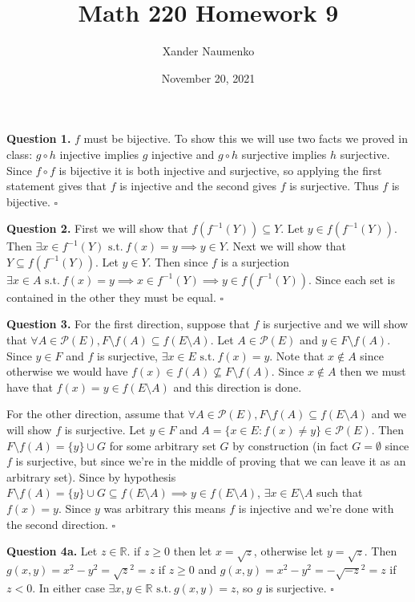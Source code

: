 \documentclass[letterpaper, reqno,11pt]{article}
\newcommand{\RR}{\mathbb{R}}
\newcommand{\st}{\text{ s.t.}\ }
\begin{document}
\title{Math 220 Homework 9}
\date{November 20, 2021}
\author{Xander Naumenko}
\maketitle

{\noindent\bf Question 1.} $f$ must be bijective. To show this we will use two facts we proved in class: $g\circ h$ injective implies $g$ injective and $g\circ h$ surjective implies $h$ surjective. Since $f\circ f$ is bijective it is both injective and surjective, so applying the first statement gives that $f$ is injective and the second gives $f$ is surjective. Thus $f$ is bijective. $\square$

{\noindent\bf Question 2.} First we will show that $f(f^{-1}(Y))\subseteq Y$. Let $y\in f(f^{-1}(Y))$. Then $\exists x\in f^{-1}(Y)\st f(x)=y\implies y\in Y$. Next we will show that $Y\subseteq f(f^{-1}(Y))$. Let $y\in Y$. Then since $f$ is a surjection $\exists x\in A\st f(x)=y\implies x\in f^{-1}(Y)\implies y\in f(f^{-1}(Y))$. Since each set is contained in the other they must be equal. $\square$

{\noindent\bf Question 3.} For the first direction, suppose that $f$ is surjective and we will show that $\forall A\in\mathcal P(E), F\setminus f(A)\subseteq f(E\setminus A)$. Let $A\in\mathcal P(E)$ and $y\in F\setminus f(A)$. Since $y\in F$ and $f$ is surjective, $\exists x\in E\st f(x)=y$. Note that $x\notin A$ since otherwise we would have $f(x)\in f(A)\not\subseteq F\setminus f(A)$. Since $x\notin A$ then we must have that $f(x)=y\in f(E\setminus A)$ and this direction is done. 

For the other direction, assume that $\forall A\in\mathcal P(E), F\setminus f(A)\subseteq f(E\setminus A)$ and we will show $f$ is surjective. Let $y\in F$ and $A=\{x\in E: f(x)\neq y\}\in\mathcal P(E)$. Then $F\setminus f(A)=\{y\}\cup G$ for some arbitrary set $G$ by construction (in fact $G=\emptyset$ since $f$ is surjective, but since we're in the middle of proving that we can leave it as an arbitrary set). Since by hypothesis $F\setminus f(A)=\{y\}\cup G\subseteq f(E\setminus A)\implies y\in f(E\setminus A)$, $\exists x\in E\setminus A$ such that $f(x)=y$. Since $y$ was arbitrary this means $f$ is injective and we're done with the second direction. $\square$

{\noindent\bf Question 4a.} Let $z\in\RR$. if $z\geq0$ then let $x=\sqrt z$, otherwise let $y=\sqrt z$. Then $g(x, y)=x^2-y^2=\sqrt{z}^2=z$ if $z\geq0$ and $g(x, y)=x^2-y^2=-\sqrt{-z}^2=z$ if $z<0$. In either case $\exists x, y\in\RR\st g(x, y)=z$, so $g$ is surjective. $\square$
\end{document}

